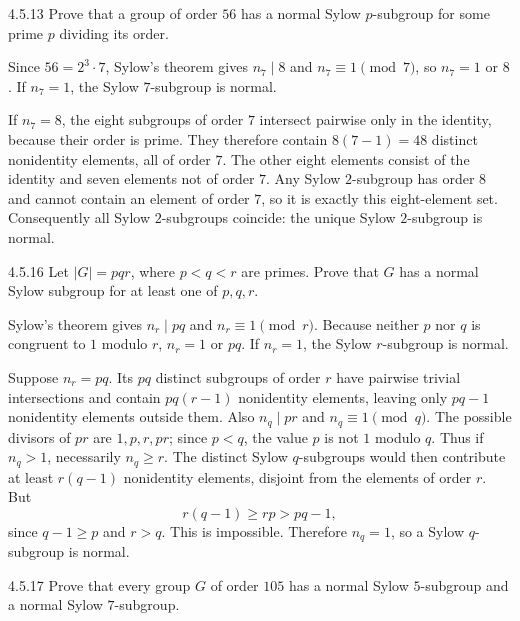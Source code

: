 \documentclass[11pt,oneside]{article}
\begin{document}

\begin{exercise}{4.5.13}
Prove that a group of order $56$ has a normal Sylow $p$-subgroup for some prime $p$ dividing its order.
\end{exercise}

\begin{solution}
Since $56=2^3\cdot7$, Sylow's theorem gives $n_7\mid8$ and $n_7\equiv1\pmod7$, so $n_7=1$ or $8$. If $n_7=1$, the Sylow $7$-subgroup is normal.

If $n_7=8$, the eight subgroups of order $7$ intersect pairwise only in the identity, because their order is prime. They therefore contain $8(7-1)=48$ distinct nonidentity elements, all of order $7$. The other eight elements consist of the identity and seven elements not of order $7$. Any Sylow $2$-subgroup has order $8$ and cannot contain an element of order $7$, so it is exactly this eight-element set. Consequently all Sylow $2$-subgroups coincide: the unique Sylow $2$-subgroup is normal.
\end{solution}

\begin{exercise}{4.5.16}
Let $|G|=pqr$, where $p<q<r$ are primes. Prove that $G$ has a normal Sylow subgroup for at least one of $p,q,r$.
\end{exercise}

\begin{solution}
Sylow's theorem gives $n_r\mid pq$ and $n_r\equiv1\pmod r$. Because neither $p$ nor $q$ is congruent to $1$ modulo $r$, $n_r=1$ or $pq$. If $n_r=1$, the Sylow $r$-subgroup is normal.

Suppose $n_r=pq$. Its $pq$ distinct subgroups of order $r$ have pairwise trivial intersections and contain $pq(r-1)$ nonidentity elements, leaving only $pq-1$ nonidentity elements outside them. Also $n_q\mid pr$ and $n_q\equiv1\pmod q$. The possible divisors of $pr$ are $1,p,r,pr$; since $p<q$, the value $p$ is not $1$ modulo $q$. Thus if $n_q>1$, necessarily $n_q\ge r$. The distinct Sylow $q$-subgroups would then contribute at least $r(q-1)$ nonidentity elements, disjoint from the elements of order $r$. But
\[
 r(q-1)\ge rp>pq-1,
\]
since $q-1\ge p$ and $r>q$. This is impossible. Therefore $n_q=1$, so a Sylow $q$-subgroup is normal.
\end{solution}

\begin{exercise}{4.5.17}
Prove that every group $G$ of order $105$ has a normal Sylow $5$-subgroup and a normal Sylow $7$-subgroup.
\end{exercise}
\end{document}
